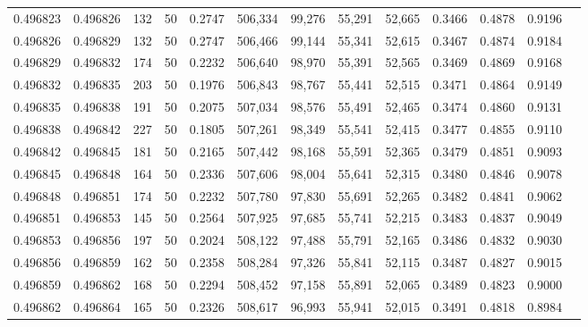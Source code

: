 \begin{tabular}{rrrrrrrrrrrrr}
0.496823 & 0.496826 &   132 &  50 &                                     0.2747 & 506,334 &  99,276 &  55,291 &  52,665 & 0.3466 & 0.4878 & 0.9196 \\
0.496826 & 0.496829 &   132 &  50 &                                     0.2747 & 506,466 &  99,144 &  55,341 &  52,615 & 0.3467 & 0.4874 & 0.9184 \\
0.496829 & 0.496832 &   174 &  50 &                                     0.2232 & 506,640 &  98,970 &  55,391 &  52,565 & 0.3469 & 0.4869 & 0.9168 \\
0.496832 & 0.496835 &   203 &  50 &                                     0.1976 & 506,843 &  98,767 &  55,441 &  52,515 & 0.3471 & 0.4864 & 0.9149 \\
0.496835 & 0.496838 &   191 &  50 &                                     0.2075 & 507,034 &  98,576 &  55,491 &  52,465 & 0.3474 & 0.4860 & 0.9131 \\
0.496838 & 0.496842 &   227 &  50 &                                     0.1805 & 507,261 &  98,349 &  55,541 &  52,415 & 0.3477 & 0.4855 & 0.9110 \\
0.496842 & 0.496845 &   181 &  50 &                                     0.2165 & 507,442 &  98,168 &  55,591 &  52,365 & 0.3479 & 0.4851 & 0.9093 \\
0.496845 & 0.496848 &   164 &  50 &                                     0.2336 & 507,606 &  98,004 &  55,641 &  52,315 & 0.3480 & 0.4846 & 0.9078 \\
0.496848 & 0.496851 &   174 &  50 &                                     0.2232 & 507,780 &  97,830 &  55,691 &  52,265 & 0.3482 & 0.4841 & 0.9062 \\
0.496851 & 0.496853 &   145 &  50 &                                     0.2564 & 507,925 &  97,685 &  55,741 &  52,215 & 0.3483 & 0.4837 & 0.9049 \\
0.496853 & 0.496856 &   197 &  50 &                                     0.2024 & 508,122 &  97,488 &  55,791 &  52,165 & 0.3486 & 0.4832 & 0.9030 \\
0.496856 & 0.496859 &   162 &  50 &                                     0.2358 & 508,284 &  97,326 &  55,841 &  52,115 & 0.3487 & 0.4827 & 0.9015 \\
0.496859 & 0.496862 &   168 &  50 &                                     0.2294 & 508,452 &  97,158 &  55,891 &  52,065 & 0.3489 & 0.4823 & 0.9000 \\
0.496862 & 0.496864 &   165 &  50 &                                     0.2326 & 508,617 &  96,993 &  55,941 &  52,015 & 0.3491 & 0.4818 & 0.8984 \\

\end{tabular}
